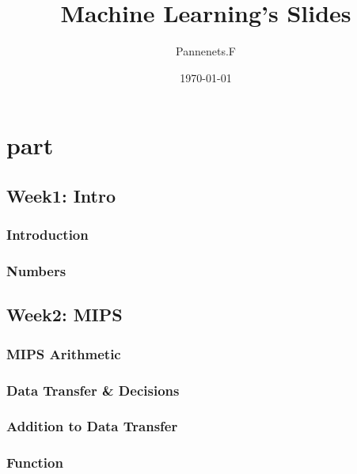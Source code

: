 \documentclass[en,11pt,english,black,simple,device=ppt]{elegantbook}
\title{Machine Learning's Slides}
\author{Pannenets.F}
\date{\today}
\begin{document}
\maketitle
\frontmatter

\mainmatter

\part{part}

\chapter{Week1: Intro}

\section{Introduction}



\section{Numbers}



\chapter{Week2: MIPS}

\section{MIPS Arithmetic}



\section{Data Transfer \& Decisions}



\section{Addition to Data Transfer}



\section{Function}
\end{document}
